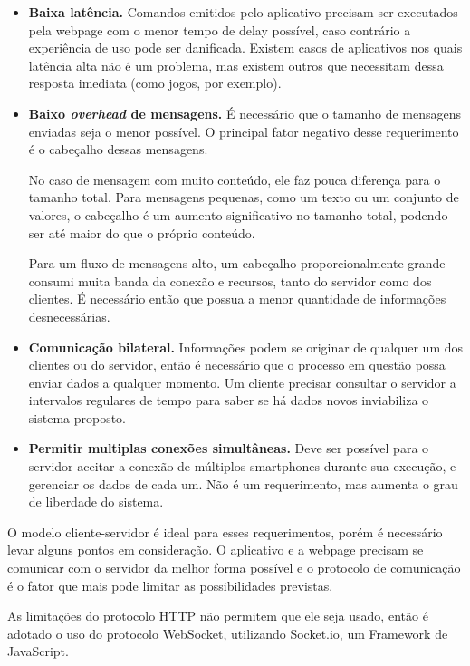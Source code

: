 \documentclass[a4paper,12pt]{article}
\begin{document}
\begin{itemize}

    \item \textbf{Baixa latência.} Comandos emitidos pelo aplicativo precisam ser executados pela webpage com o menor tempo de delay possível, caso contrário a experiência de uso pode ser danificada. Existem casos de aplicativos nos quais latência alta não é um problema, mas existem outros que necessitam dessa resposta imediata (como jogos, por exemplo).

    \item \textbf{Baixo \emph{overhead} de mensagens.} É necessário que o tamanho de mensagens enviadas seja o menor possível. O principal fator negativo desse requerimento é o cabeçalho dessas mensagens.

    No caso de mensagem com muito conteúdo, ele faz pouca diferença para o tamanho total. Para mensagens pequenas, como um texto ou um conjunto de valores, o cabeçalho é um aumento significativo no tamanho total, podendo ser até maior do que o próprio conteúdo.

    Para um fluxo de mensagens alto, um cabeçalho proporcionalmente grande consumi muita banda da conexão e recursos, tanto do servidor como dos clientes. É necessário então que possua a menor quantidade de informações desnecessárias.

    \item \textbf{Comunicação bilateral.} Informações podem se originar de qualquer um dos clientes ou do servidor, então é necessário que o processo em questão possa enviar dados a qualquer momento. Um cliente precisar consultar o servidor a intervalos regulares de tempo para saber se há dados novos inviabiliza o sistema proposto.

    \item \textbf{Permitir multiplas conexões simultâneas.} Deve ser possível para o servidor aceitar a conexão de múltiplos smartphones durante sua execução, e gerenciar os dados de cada um. Não é um requerimento, mas aumenta o grau de liberdade do sistema.

\end{itemize}

O modelo cliente-servidor é ideal para esses requerimentos, porém é necessário levar alguns pontos em consideração. O aplicativo e a webpage precisam se comunicar com o servidor da melhor forma possível e o protocolo de comunicação é o fator que mais pode limitar as possibilidades previstas.

As limitações do protocolo HTTP não permitem que ele seja usado, então é adotado o uso do protocolo WebSocket, utilizando Socket.io, um Framework de JavaScript.
\end{document}
